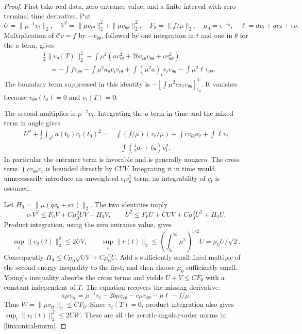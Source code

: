 \begin{proof}
First take real data, zero entrance value, and a finite interval with
zero terminal time derivative.  Put
\[
 U=\|\mu^{-1}v_t\|_2,\quad
 V^2=\|\mu v_{t\theta}\|_2^2+\|\mu v_{\theta\theta}\|_2^2,
 \quad F_0=\|f/\mu\|_2,\quad \mu_0=e^{-t_0},
 \quad \ell=dv_t+qv_\theta+ev.
\]
Multiplication of $\mathcal Cv=f$ by $-v_{\theta\theta}$, followed by
one integration in $t$ and one in $\theta$ for the $a$ term, gives
\begin{align}
 &\tfrac12\|v_\theta(T)\|_2^2
 +\int\mu^2
       (a v_{t\theta}^2+2b v_{t\theta}v_{\theta\theta}
                                      +c v_{\theta\theta}^2)
 \nonumber\\
 &\quad=-\int f v_{\theta\theta}
       -\int\mu^2a_\theta v_t v_{t\theta}
       +\int(\mu^2a)_t v_t v_{\theta\theta}
       -\int\mu^2\ell v_{\theta\theta}.\label{lin:conical-first}
\end{align}
The boundary term suppressed in this identity is
$-[\int\mu^2a v_t v_{\theta\theta}]_{t_0}^T$.  It vanishes because
$v_{\theta\theta}(t_0)=0$ and $v_t(T)=0$.

The second multiplier is $\mu^{-2}v_t$.  Integrating the $a$ term in
time and the mixed term in angle gives
\begin{align}
 U^2+\tfrac12\int_{S^1}a(t_0)v_t(t_0)^2
 ={}&\int(f/\mu)(v_t/\mu)+\int c v_{\theta\theta}v_t
       +\int\ell v_t\nonumber\\
 &-\int(\tfrac12a_t+b_\theta)v_t^2.
 \label{lin:conical-second}
\end{align}
In particular the entrance term is favorable and is generally nonzero.
The cross term $\int c v_{\theta\theta}v_t$ is bounded directly by
$CUV$.  Integrating it in time would unnecessarily introduce an
unweighted $c_t v_\theta^2$ term; no integrability of $c_t$ is assumed.

Let $H_0=\|\mu(qv_\theta+ev)\|_2$.  The two identities imply
\[
 c_*V^2\le F_0V+C\mu_0^2UV+H_0V,
 \qquad
 U^2\le F_0U+CUV+C\mu_0^2U^2+H_0U.
\]
Product integration, using the zero entrance value, gives
\[
 \sup_t\|v_\theta(t)\|_2^2\le2UV,
 \qquad
 \sup_t\|v(t)\|_2\le(\int_{t_0}^\infty\mu^2)^{1/2}U
                         =\mu_0 U/\sqrt2.
\]
Consequently
$H_0\le C\mu_0\sqrt{UV}+C\mu_0^2U$.
Add a sufficiently small fixed multiple of the second energy inequality
to the first, and then choose $\mu_0$ sufficiently small.  Young's
inequality absorbs the cross terms and yields
$U+V\le CF_0$ with a constant independent of $T$.
The equation recovers the missing derivative:
\[
 a\mu v_{tt}=\mu^{-1}v_t-2b\mu v_{t\theta}
             -c\mu v_{\theta\theta}-\mu\ell-f/\mu.
\]
Thus $W=\|\mu v_{tt}\|_2\le CF_0$.  Since $v_t(T)=0$,
product integration also gives
$\sup_t\|v_t(t)\|_2^2\le2UW$.
These are all the zeroth-angular-order norms in
\eqref{lin:conical-norm}.


\end{proof}

